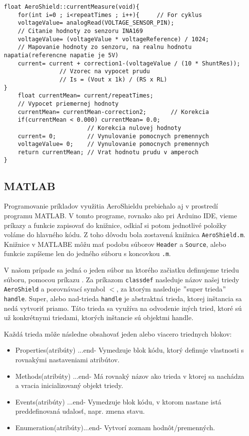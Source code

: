 \begin{lstlisting}[caption={Zdrojový kód funkcie currentMeasure.},captionpos=b]	
float AeroShield::currentMeasure(void){  
	for(int i=0 ; i<repeatTimes ; i++){     // For cyklus
	voltageValue= analogRead(VOLTAGE_SENSOR_PIN);     
	// Citanie hodnoty zo senzoru INA169 
	voltageValue= (voltageValue * voltageReference) / 1024;    
	// Mapovanie hodnoty zo senzoru, na realnu hodnotu napatia(referencne napatie je 5V)
	current= current + correction1-(voltageValue / (10 * ShuntRes));    
                // Vzorec na vypocet prudu
                // Is = (Vout x 1k) / (RS x RL)
}                                                                         	
	float currentMean= current/repeatTimes;   
	// Vypocet priemernej hodnoty  
	currentMean= currentMean-correction2;       // Korekcia
	if(currentMean < 0.000) currentMean= 0.0;                 
	                    // Korekcia nulovej hodnoty
	current= 0;         // Vynulovanie pomocnych premennych   
	voltageValue= 0;    // Vynulovanie pomocnych premennych   
	return currentMean; // Vrat hodnotu prudu v amperoch
}
\end{lstlisting}
	
\subsection{MATLAB}	
	
Programovanie príkladov využitia AeroShieldu prebiehalo aj v prostredí programu MATLAB. V tomto programe, rovnako ako pri Arduino IDE, vieme príkazy a funkcie zapisovať do knižnice, odkiaľ si potom jednotlivé položky voláme do hlavného kódu. Z toho dôvodu bola zostavená knižnica \verb|AeroShield.m|. Knižnice v MATLABE môžu mať podobu súborov \verb|Header| a \verb|Source|, alebo funkcie zapíšeme len do jedného súboru s koncovkou \verb|.m|. 

V našom prípade sa jedná o jeden súbor na ktorého začiatku definujeme triedu súboru, pomocou príkazu . Za príkazom \verb|classdef| nasleduje názov našej triedy \verb|AeroShield| a porovnávací symbol $<$, za ktorým nasleduje $"$super trieda$"$ \verb|handle|. Super, alebo nad-trieda \verb|handle| je abstraktná trieda, ktorej inštancia sa nedá vytvoriť priamo. Táto trieda sa využíva na odvodenie iných tried, ktoré sú už konkrétnymi triedami, ktorých inštancie sú objektmi handle. 

Každá trieda môže následne obsahovať jeden alebo viacero triednych blokov: 
\begin{itemize}
	\item Properties(atribúty) ...end- Vymedzuje blok kódu, ktorý definuje vlastnosti s rovnakými nastaveniami atribútov.
	\item Methods(atribúty)    ...end- Má rovnaký názov ako trieda v ktorej sa nachádza a vracia inicializovaný objekt triedy.
	\item Events(atribúty)     ...end- Vymedzuje blok kódu, v ktorom nastane istá preddefinovaná udalosť, napr. zmena stavu. 
	\item Enumeration(atribúty)...end- Vytvorí zoznam hodnôt/premenných. 
\end{itemize}


